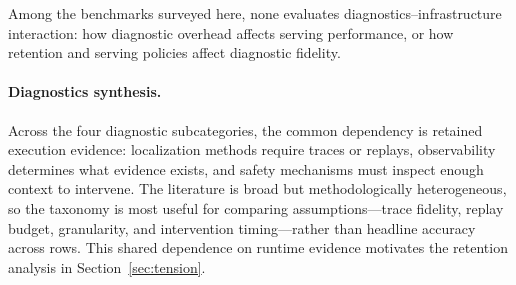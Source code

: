 Among the benchmarks surveyed here, none evaluates diagnostics--infrastructure interaction: how diagnostic overhead affects serving performance, or how retention and serving policies affect diagnostic fidelity.

\paragraph*{Diagnostics synthesis.} Across the four diagnostic subcategories, the common dependency is retained execution evidence: localization methods require traces or replays, observability determines what evidence exists, and safety mechanisms must inspect enough context to intervene. The literature is broad but methodologically heterogeneous, so the taxonomy is most useful for comparing assumptions---trace fidelity, replay budget, granularity, and intervention timing---rather than headline accuracy across rows. This shared dependence on runtime evidence motivates the retention analysis in Section~\ref{sec:tension}.


